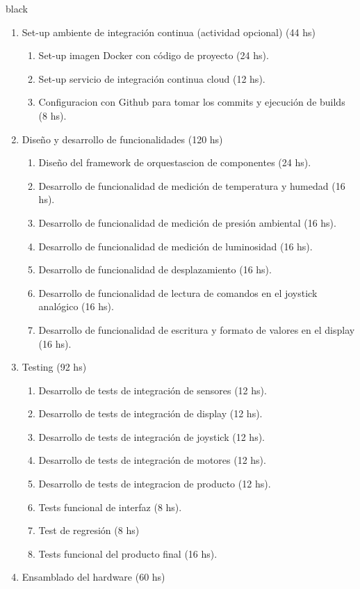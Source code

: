 \documentclass[
11pt, %
]{charter}
\begin{document}
\begin{consigna}{black}
\begin{enumerate}
\begin{enumerate}
	\end{enumerate}
\item Set-up ambiente de integración continua (actividad opcional) (44 hs)
	\begin{enumerate}
	\item Set-up imagen Docker con código de proyecto (24 hs).
	\item Set-up servicio de integración continua cloud (12 hs).
	\item Configuracion con Github para tomar los commits y ejecución de builds (8 hs).
	\end{enumerate}
\item Diseño y desarrollo de funcionalidades (120 hs)
	\begin{enumerate}
	\item Diseño del framework de orquestascion de componentes (24 hs).
	\item Desarrollo de funcionalidad de medición de temperatura y humedad (16 hs).
	\item Desarrollo de funcionalidad de medición de presión ambiental (16 hs).
	\item Desarrollo de funcionalidad de medición de luminosidad (16 hs).
	\item Desarrollo de funcionalidad de desplazamiento (16 hs).
	\item Desarrollo de funcionalidad de lectura de comandos en el joystick analógico (16 hs).
	\item Desarrollo de funcionalidad de escritura y formato de valores en el display (16 hs).
	\end{enumerate}
\item Testing (92 hs)
	\begin{enumerate}
	\item Desarrollo de tests de integración de sensores (12 hs).
	\item Desarrollo de tests de integración de display (12 hs).
	\item Desarrollo de tests de integración de joystick (12 hs).
	\item Desarrollo de tests de integración de motores (12 hs).
	\item Desarrollo de tests de integracion de producto (12 hs).
	\item Tests funcional de interfaz (8 hs).
	\item Test de regresión (8 hs)
	\item Tests funcional del producto final (16 hs).
	\end{enumerate}
\item Ensamblado del hardware (60 hs)

\end{enumerate}
\end{consigna}
\end{document}
